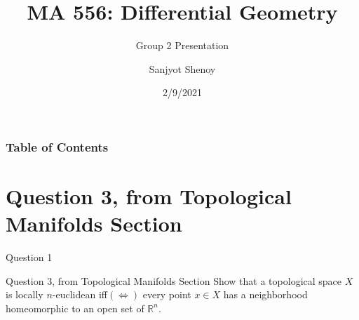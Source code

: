 \documentclass{beamer}
\title[MA 556 Presentation] %
{MA 556: Differential Geometry}
\subtitle{Group 2 Presentation}
\author[Sanjyot Shenoy] %
{Sanjyot Shenoy}
\institute[IIT-B] %
{
  18B030023 \\
  Indian Institute of Technology, Bombay
}
\date[2/9/2021] %
{2/9/2021}
\begin{document}
\frame{\titlepage}


\begin{frame}
\frametitle{Table of Contents}
\tableofcontents[]
\end{frame}



\section{Question 3, from Topological Manifolds Section}
\begin{frame}{Question 1}
\begin{block}{Question 3, from Topological Manifolds Section}
Show that a topological space $\displaystyle X$ is locally $n$-euclidean iff$\displaystyle ( \Leftrightarrow )$ every point $\displaystyle x\in X$ has a neighborhood homeomorphic to an open set of $\displaystyle \mathbb{R}^{n}$.
\end{block}
\end{frame}
\end{document}

